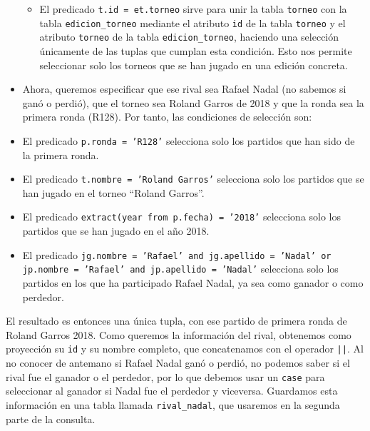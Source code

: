 \begin{itemize}
\begin{itemize}
\item El predicado \texttt{t.id = et.torneo} sirve para unir la tabla \texttt{torneo} con la tabla \texttt{edicion\_torneo} mediante el atributo \texttt{id} de la tabla \texttt{torneo} y el atributo \texttt{torneo} de la tabla \texttt{edicion\_torneo}, haciendo una selección únicamente de las tuplas que cumplan esta condición. Esto nos permite seleccionar solo los torneos que se han jugado en una edición concreta.
\end{itemize}
\item Ahora, queremos especificar que ese rival sea Rafael Nadal (no sabemos si ganó o perdió), que el torneo sea Roland Garros de 2018 y que la ronda sea la primera ronda (R128). Por tanto, las condiciones de selección son:
\item El predicado \texttt{p.ronda = 'R128'} selecciona solo los partidos que han sido de la primera ronda.
\item El predicado \texttt{t.nombre = 'Roland Garros'} selecciona solo los partidos que se han jugado en el torneo ``Roland Garros''.
\item El predicado \texttt{extract(year from p.fecha) = '2018'} selecciona solo los partidos que se han jugado en el año 2018.
\item El predicado \texttt{jg.nombre = 'Rafael' and jg.apellido = 'Nadal' or jp.nombre = 'Rafael' and jp.apellido = 'Nadal'} selecciona solo los partidos en los que ha participado Rafael Nadal, ya sea como ganador o como perdedor.
\end{itemize}

El resultado es entonces una única tupla, con ese partido de primera ronda de Roland Garros 2018. Como queremos la información del rival, obtenemos como proyección su \texttt{id} y su nombre completo, que concatenamos con el operador \texttt{||}. Al no conocer de antemano si Rafael Nadal ganó o perdió, no podemos saber si el rival fue el ganador o el perdedor, por lo que debemos usar un \texttt{case} para seleccionar al ganador si Nadal fue el perdedor y viceversa. Guardamos esta información en una tabla llamada \texttt{rival\_nadal}, que usaremos en la segunda parte de la consulta. \\

